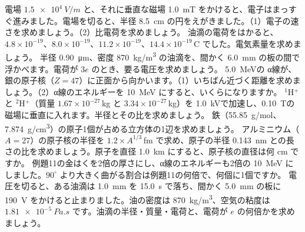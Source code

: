 \bkendproblems
{}
\bkproblem 電場 $\qty{1.5e4}{V/m}$ と、それに垂直な磁場 \qty{1.0}{mT} をかけると、電子はまっすぐ進みました。電場を切ると、半径 \qty{8.5}{cm} の円をえがきました。（1）電子の速さを求めましょう。（2）比電荷を求めましょう。
\bkproblem 油滴の電荷をはかると、$4.8\times10^{-19}$、$8.0\times10^{-19}$、$11.2\times10^{-19}$、$14.4\times10^{-19}$\,C でした。電気素量を求めましょう。
\bkproblem 半径 \qty{0.90}{\micro m}、密度 \qty{870}{kg/m^3} の油滴を、間かく \qty{6.0}{mm} の板の間で浮かべます。電荷が $3e$ のとき、要る電圧を求めましょう。
\bkproblem \qty{5.0}{MeV}の α線が、銀の原子核（$Z=47$）に正面から向かいます。（1）いちばん近づく距離を求めましょう。（2）α線のエネルギーを \qty{10}{MeV} にすると、いくらになりますか。
\bkproblem $^1$H$^+$ と $^2$H$^+$（質量 $1.67\times10^{-27}$\,kg と $3.34\times10^{-27}$\,kg）を \qty{1.0}{kV}で加速し、\qty{0.10}{T}の磁場に垂直に入れます。半径とその比を求めましょう。
\bkproblem 鉄（\qty{55.85}{g/mol}、\qty{7.874}{g/cm^3}）の原子1個が占める立方体の1辺を求めましょう。
\bkproblem アルミニウム（$A=27$）の原子核の半径を $1.2\times A^{1/3}$\,fm で求め、原子の半径 \qty{0.143}{nm} との長さの比を求めましょう。原子を直径 \qty{1.0}{km} にすると、原子核の直径は何 cm ですか。
\bkproblem 例題11の金はくを2倍の厚さにし、α線のエネルギーも2倍の \qty{10}{MeV} にしました。$90^\circ$ より大きく曲がる割合は例題11の何倍で、何個に1個ですか。
\bkproblem 電圧を切ると、ある油滴は \qty{1.0}{mm} を \qty{15.0}{s} で落ち、間かく \qty{5.0}{mm} の板に \qty{190}{V} をかけると止まりました。油の密度は \qty{870}{kg/m^3}、空気の粘度は $\qty{1.81e-5}{Pa.s}$ です。油滴の半径・質量・電荷と、電荷が $e$ の何倍かを求めましょう。
